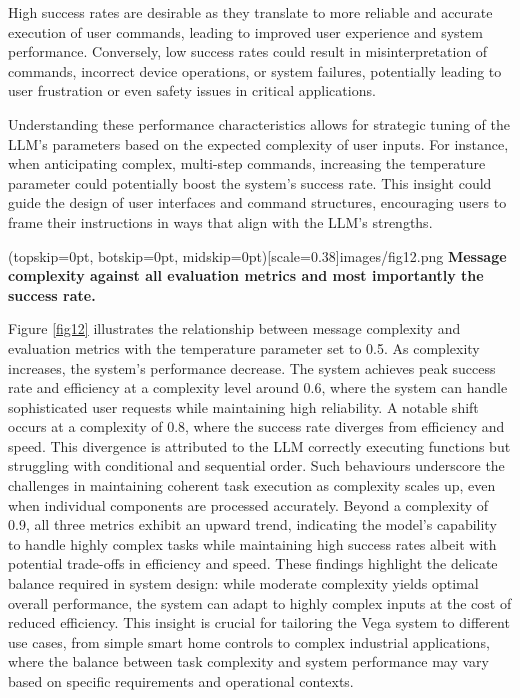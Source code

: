 \documentclass{ieeeaccess}
\begin{document}
High success rates are desirable as they translate to more reliable and accurate execution of user commands, leading to improved user experience and system performance. Conversely, low success rates could result in misinterpretation of commands, incorrect device operations, or system failures, potentially leading to user frustration or even safety issues in critical applications. 

Understanding these performance characteristics allows for strategic tuning of the LLM's parameters based on the expected complexity of user inputs. For instance, when anticipating complex, multi-step commands, increasing the temperature parameter could potentially boost the system's success rate. This insight could guide the design of user interfaces and command structures, encouraging users to frame their instructions in ways that align with the LLM's strengths.

\Figure[t!](topskip=0pt, botskip=0pt,
midskip=0pt)[scale=0.38]{{images/fig12.png}}
{ \textbf{Message complexity against all evaluation metrics and most importantly the success rate.}\label{fig12}}

Figure \ref{fig12} illustrates the relationship between message complexity and evaluation metrics with the temperature parameter set to 0.5. As complexity increases, the system's performance decrease. The system achieves peak success rate and efficiency at a complexity level around 0.6, where the system can handle sophisticated user requests while maintaining high reliability. A notable shift occurs at a complexity of 0.8, where the success rate diverges from efficiency and speed. This divergence is attributed to the LLM correctly executing functions but struggling with conditional and sequential order. Such behaviours underscore the challenges in maintaining coherent task execution as complexity scales up, even when individual components are processed accurately. Beyond a complexity of 0.9, all three metrics exhibit an upward trend, indicating the model's capability to handle highly complex tasks while maintaining high success rates albeit with potential trade-offs in efficiency and speed. These findings highlight the delicate balance required in system design: while moderate complexity yields optimal overall performance, the system can adapt to highly complex inputs at the cost of reduced efficiency. This insight is crucial for tailoring the Vega system to different use cases, from simple smart home controls to complex industrial applications, where the balance between task complexity and system performance may vary based on specific requirements and operational contexts. 
\end{document}
